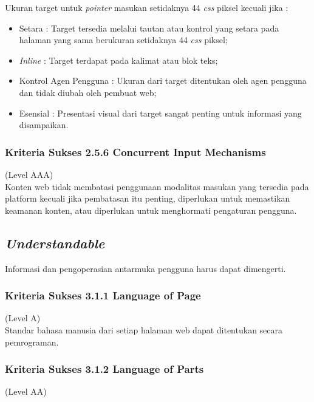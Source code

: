\documentclass[a4paper,twoside]{article}
\begin{document}
\begin{enumerate}
		Ukuran target untuk \textit{pointer} masukan setidaknya 44 \textit{css} piksel kecuali jika :
		
		\begin{itemize}
			\item Setara : Target tersedia melalui tautan atau kontrol yang setara pada halaman yang sama berukuran setidaknya 44 \textit{css} piksel;
			\item \textit{Inline} : Target terdapat pada kalimat atau blok teks;
			\item Kontrol Agen Pengguna : Ukuran dari target ditentukan oleh agen pengguna dan tidak diubah oleh pembuat web;
			\item Esensial : Presentasi visual dari target sangat penting untuk informasi yang disampaikan.
		\end{itemize}
		
		\subsubsection*{Kriteria Sukses 2.5.6 Concurrent Input Mechanisms}
		\label{subsubsec:kriteria_2.5.6}
		(Level AAA) \\
		
		Konten web tidak membatasi penggunaan modalitas masukan yang tersedia pada platform kecuali jika pembatasan itu penting, diperlukan untuk memastikan keamanan konten, atau diperlukan untuk menghormati pengaturan pengguna.
		
		\subsection*{\textit{Understandable}}
		\label{subsec:understandable}
		Informasi dan pengoperasian antarmuka pengguna harus dapat dimengerti.
		
		\subsubsection*{Kriteria Sukses 3.1.1 Language of Page}
		\label{subsubsec:kriteria_3.1.1}
		(Level A) \\
		
		Standar bahasa manusia dari setiap halaman web dapat ditentukan secara pemrograman.
		
		\subsubsection*{Kriteria Sukses 3.1.2 Language of Parts}
		\label{subsubsec:kriteria_3.1.2}
		(Level AA) \\
		

\end{enumerate}
\end{document}

